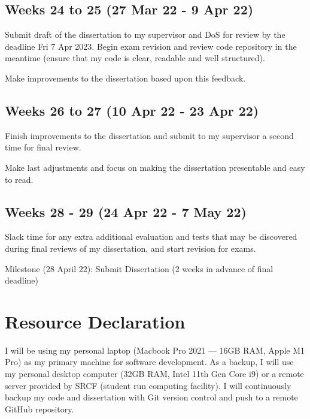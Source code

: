 \documentclass[12pt,a4paper,twoside]{article}
\begin{document}
\subsection*{Weeks 24 to 25 (27 Mar 22 - 9 Apr 22)}

Submit draft of the dissertation to my supervisor and DoS for review by the deadline Fri 7 Apr 2023. Begin exam revision and review code repository in the meantime (ensure that my code is clear, readable and well structured).

Make improvements to the dissertation based upon this feedback.

\subsection*{Weeks 26 to 27 (10 Apr 22 - 23 Apr 22)}

Finish improvements to the dissertation and submit to my supervisor a second time for final review. 

Make last adjustments and focus on making the dissertation presentable and easy to read. 

\subsection*{Weeks 28 - 29 (24 Apr 22 - 7 May 22)}

Slack time for any extra additional evaluation and tests that may be discovered during final reviews of my dissertation, and start revision for exams.

Milestone (28 April 22): Submit Dissertation (2 weeks in advance of final deadline)


\section{Resource Declaration}

I will be using my personal laptop (Macbook Pro 2021 --- 16GB RAM, Apple M1 Pro) as my primary machine for software development. As a backup, I will use my personal desktop computer (32GB RAM, Intel 11th Gen Core i9) or a remote server provided by SRCF (student run computing facility). I will continuously backup my code and dissertation with Git version control and push to a remote GitHub repository.


\newpage

\printbibliography[heading=subbibliography]

\appendix
\end{document}
